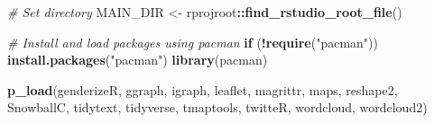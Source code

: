 \documentclass[]{article}
\newenvironment{Shaded}{\begin{snugshade}}{\end{snugshade}}
\newcommand{\KeywordTok}[1]{\textcolor[rgb]{0.13,0.29,0.53}{\textbf{#1}}}
\newcommand{\StringTok}[1]{\textcolor[rgb]{0.31,0.60,0.02}{#1}}
\newcommand{\CommentTok}[1]{\textcolor[rgb]{0.56,0.35,0.01}{\textit{#1}}}
\newcommand{\ControlFlowTok}[1]{\textcolor[rgb]{0.13,0.29,0.53}{\textbf{#1}}}
\newcommand{\OperatorTok}[1]{\textcolor[rgb]{0.81,0.36,0.00}{\textbf{#1}}}
\newcommand{\NormalTok}[1]{#1}
\begin{document}
\begin{Shaded}
\begin{Highlighting}[]
\CommentTok{# Set directory}
\NormalTok{MAIN_DIR <-}\StringTok{ }\NormalTok{rprojroot}\OperatorTok{::}\KeywordTok{find_rstudio_root_file}\NormalTok{()}

\CommentTok{# Install and load packages using pacman}
\ControlFlowTok{if}\NormalTok{ (}\OperatorTok{!}\KeywordTok{require}\NormalTok{(}\StringTok{"pacman"}\NormalTok{)) }\KeywordTok{install.packages}\NormalTok{(}\StringTok{"pacman"}\NormalTok{)}
\KeywordTok{library}\NormalTok{(pacman)}

\KeywordTok{p_load}\NormalTok{(genderizeR, ggraph, igraph, leaflet, magrittr, maps, reshape2, SnowballC, tidytext, }
\NormalTok{       tidyverse, tmaptools, twitteR, wordcloud, wordcloud2)}
\end{Highlighting}
\end{Shaded}
\end{document}
